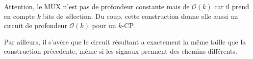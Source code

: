 \documentclass[11pt]{article}
\begin{document}
\begin{enumerate}
\begin{solution}
{
}

Attention, le MUX n'est pas de profondeur constante mais de $\mathcal{O}(k)$
car il prend en compte $k$ bits de sélection. Du coup, cette construction
donne elle aussi un circuit de profondeur $\mathcal{O}(k)$ pour un $k$-CP.

Par ailleurs, il s'avère que le circuit résultant a exactement la même
taille que la construction précedente, même si les signaux prennent
des chemins différents.

\end{solution}

\end{enumerate}
\end{document}
